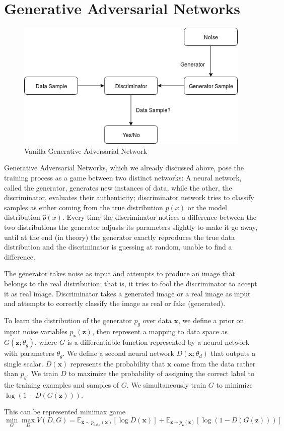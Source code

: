 \section{Generative Adversarial Networks} %
\label{sec:generative_adversarial_networks}
\begin{figure}[H]
\centering\includegraphics[width=.7\textwidth]{images/vanillaGAN.png}
\caption{Vanilla Generative Adversarial Network}
\label{fig:gans}
\end{figure}
Generative Adversarial Networks, which we already discussed above, pose the training process as a game between two distinct networks: A neural network, called the generator, generates new instances of data, while the other, the discriminator, evaluates their authenticity; discriminator network tries to classify samples as either coming from the true distribution $p(x)$ or the model distribution $\hat{p}(x)$. Every time the discriminator notices a difference between the two distributions the generator adjusts its parameters slightly to make it go away, until at the end (in theory) the generator exactly reproduces the true data distribution and the discriminator is guessing at random, unable to find a difference.\par\bigskip
The generator takes noise as input and attempts to produce an image that belongs to the real distribution; that is, it tries to fool the discriminator to accept it as real image. Discriminator takes a generated image or a real image as input and attempts to correctly classify the image as real or fake (generated).\par\bigskip
To learn the distribution of the generator $p_g$ over data $\bm{x}$, we define a prior on input noise variables $p_{\bm{z}}(\bm{z})$, then represent a mapping to data space as $G(\bm{z}; \theta_g)$, where $G$ is a differentiable function represented by a neural network with parameters $\theta_g$. We define a second neural network $D(\bm{x}; \theta_d)$ that outputs a single scalar. $D(\bm{x})$ represents the probability that $\bm{x}$ came from the data rather than $p_g$. We train $D$ to maximize the probability of assigning the correct label to the training examples and samples of $G$. We simultaneously train $G$ to minimize $\log(1-D(G(\bm{z})))$.\par\bigskip
\noindent This can be represented minimax game \\
\begin{equation} \label{eu_eqn}
\min_{G} \max_{D} V(D, G)=\mathbb{E}_{\bm{x} \sim p_{\text{data}}(\bm{x})}[\log D(\bm{x})]+\mathbb{E}_{\bm{z} \sim p_{\bm{z}}(\bm{z})}[\log (1 - D(G(\bm{z})))]
\end{equation}

